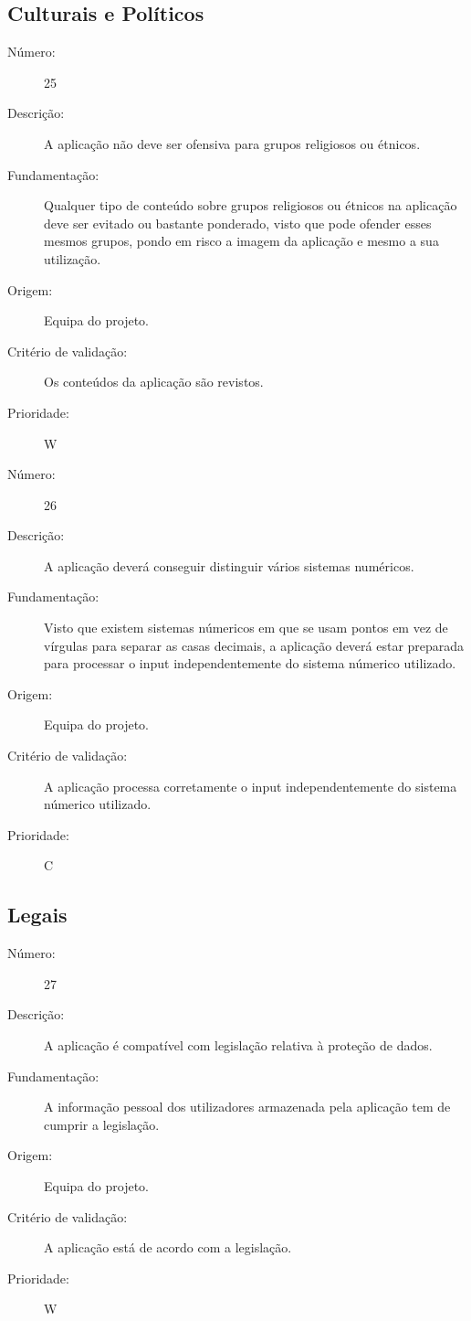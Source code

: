 \documentclass[12pt,a4paper]{article}
\begin{document}
  \subsection{Culturais e Políticos}

            \begin{description}
        \item[Número:]25
        \item[Descrição:]A aplicação não deve ser ofensiva para grupos religiosos ou étnicos.
        \item[Fundamentação:]Qualquer tipo de conteúdo sobre grupos religiosos ou étnicos na aplicação deve ser evitado ou bastante ponderado, visto que pode ofender esses mesmos grupos, pondo em risco a imagem da aplicação e mesmo a sua utilização.
        \item[Origem:]Equipa do projeto.
        \item[Critério de validação:]Os conteúdos da aplicação são revistos.
        \item[Prioridade:]W
      \end{description}
      \vspace{0.5cm}

            \begin{description}
        \item[Número:]26
        \item[Descrição:]A aplicação deverá conseguir distinguir vários sistemas numéricos.
        \item[Fundamentação:]Visto que existem sistemas númericos em que se usam pontos em vez de vírgulas para separar as casas decimais, a aplicação deverá estar preparada para processar o input independentemente do sistema númerico utilizado.
        \item[Origem:]Equipa do projeto.
        \item[Critério de validação:]A aplicação processa corretamente o input independentemente do sistema númerico utilizado.
        \item[Prioridade:]C
      \end{description}

  \subsection{Legais}

            \begin{description}
        \item[Número:]27
        \item[Descrição:] A aplicação é compatível com legislação relativa à proteção de dados.
        \item[Fundamentação:]A informação pessoal dos utilizadores armazenada pela aplicação tem de cumprir a legislação.
        \item[Origem:]Equipa do projeto.
        \item[Critério de validação:]A aplicação está de acordo com a legislação.
        \item[Prioridade:]W
      \end{description}
\newpage
\end{document}
